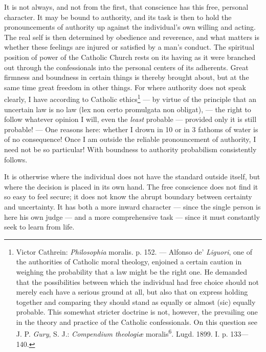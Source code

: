 \documentclass[12pt,a4paper,openany]{book}
\newcommand{\opage}[1]{\marginnote{\footnotesize\textit{[#1]}}}
\begin{document}
It is not always, and not from the first, that conscience has this free, personal character. It may be
bound to authority, and its task is then to hold the pronouncements of authority up against the
individual's own willing and acting. The real
\opage{82}self is then determined by obedience and reverence, and what matters is whether these feelings are
injured or satisfied by a man's conduct. The spiritual position of power of the Catholic Church rests on
its having as it were branched out through the confessionals into the personal centers of its
adherents. Great firmness and boundness in certain things is thereby brought about, but at the same
time great freedom in other things. For where authority does not speak clearly, I have according to
Catholic ethics\footnote[1]{Victor Cathrein: \textit{Philosophia} moralis. p. 152. --- Alfonso de'
\emph{Liguori}, one of the authorities of Catholic moral theology, enjoined a certain caution in
weighing the probability that a law might be the right one. He demanded that the possibilities between
which the individual had free choice should not merely each have a serious ground at all, but also that
on express holding together and comparing they should stand as equally or almost (sic) equally
probable. This somewhat stricter doctrine is not, however, the prevailing one in the theory and
practice of the Catholic confessionals. On this question see J. P. \emph{Gury}, S. J.:
\textit{Compendium theologiæ} moralis\textsuperscript{6}. Lugd. 1899. I. p. 133---140.} --- by
virtue of the principle that an uncertain law is no law (lex non certo promulgata non obligat), ---
the right to follow whatever opinion I will, even the \textit{least} probable --- provided only it is
still probable! --- One reasons here: whether I drown in 10 or in 3 fathoms of water is of no
consequence! Once I am outside the reliable pronouncement of authority, I need not be so particular!
With boundness to authority probabilism consistently follows.

It is otherwise where the individual does not have the standard outside itself, but where the decision
is placed in its own hand. The free conscience does not find it so easy to feel secure; it does not
know the abrupt boundary between certainty and uncertainty. It has both a more inward character ---
since the single person is here his own judge --- and a more comprehensive task --- since it must
constantly seek to learn from life.
\end{document}
